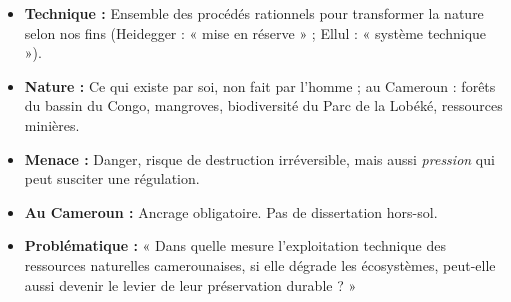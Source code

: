 \documentclass[11pt]{article}
\begin{document}
\begin{definition}
\begin{itemize}
\item \textbf{Technique :} Ensemble des procédés rationnels pour transformer la nature selon nos fins (Heidegger : « mise en réserve » ; Ellul : « système technique »).
\item \textbf{Nature :} Ce qui existe par soi, non fait par l'homme ; au Cameroun : forêts du bassin du Congo, mangroves, biodiversité du Parc de la Lobéké, ressources minières.
\item \textbf{Menace :} Danger, risque de destruction irréversible, mais aussi \emph{pression} qui peut susciter une régulation.
\item \textbf{Au Cameroun :} Ancrage obligatoire. Pas de dissertation hors-sol.
\item \textbf{Problématique :} « Dans quelle mesure l'exploitation technique des ressources naturelles camerounaises, si elle dégrade les écosystèmes, peut-elle aussi devenir le levier de leur préservation durable ? »
\end{itemize}
\end{definition}
\end{document}
